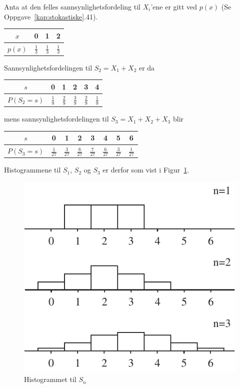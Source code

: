 Anta at den felles sannsynlighetsfordeling til $X_i$'ene er gitt
ved $p(x)$ (Se Oppgave~\ref*{kap:stokastiske}.41).

\begin{center}
\begin{tabular}{c|ccc}
 $x$   &  0  &  1  &  2 \\ \hline
 $p(x)$&$\frac{1}{3}$&$\frac{1}{3}$&$\frac{1}{3}$
\end{tabular}
\end{center}
\noindent Sannsynlighetsfordelingen til $S_2=X_1+X_2$ er da
\begin{center}
\begin{tabular}{c|ccccc}
 $s$   &  0  &  1  &  2 &  3  &  4\\ \hline
 $P(S_2=s)$&$\frac{1}{9}$&$\frac{2}{9}$&$\frac{3}{9}$&
                                  $\frac{2}{9}$&$\frac{1}{9}$
\end{tabular}
\end{center}
\noindent mens sannsynlighetsfordelingen til $S_3=X_1+X_2+X_3$ blir
\begin{center}
\begin{tabular}{c|ccccccc}
 $s$   &  0  &  1  &  2 &  3  &  4  &  5  &  6\\ \hline
 $P(S_3=s)$&$\frac{1}{27}$&$\frac{3}{27}$&$\frac{6}{27}$&
                 $\frac{7}{27}$&$\frac{6}{27}$&$\frac{3}{27}$&$\frac{1}{27}$
\end{tabular}
\end{center}
\noindent Histogrammene til $S_1$, $S_2$ og $S_3$ er derfor som vist i
Figur~\ref{fig:hist_k6}.

\begin{figure}[ht]
\centering
	\includegraphics[scale=1.0]{figurer/fig6_4.pdf} 
\caption{Histogrammet til $S_n$}
	\label{fig:hist_k6}
\end{figure}

